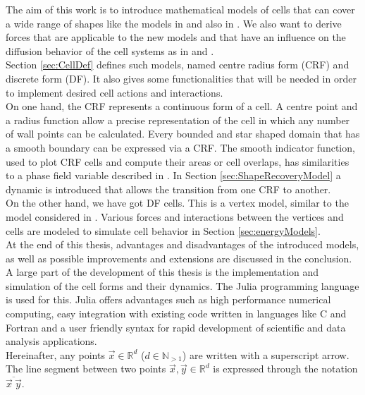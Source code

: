\documentclass[a4paper,12pt,leqno]{article}
\theoremstyle{plain}
\theoremstyle{remark}
\newcommand{\R}{\mathbb{R}}
\newcommand{\N}{\mathbb{N}}
\begin{document}
The aim of this work is to introduce mathematical models of cells that can cover a wide range of shapes like the models in \cite{Happel2023} and also in \cite{Fletcher14}. We also want to derive forces that are applicable to the new models and that have an influence on the diffusion behavior of the cell systems as in \cite{Bruna2012} and \cite{Bruna2017}. \\
Section \ref{sec:CellDef} defines such models, named centre radius form (CRF) and discrete form (DF). It also gives some functionalities that will be needed in order to implement desired cell actions and interactions. \\
On one hand, the CRF represents a continuous form of a cell. A centre point and a radius function allow a precise representation of the cell in which any number of wall points can be calculated. Every bounded and star shaped domain that has a smooth boundary can be expressed via a CRF. The smooth indicator function, used to plot CRF cells and compute their areas or cell overlaps, has similarities to a phase field variable described in \cite{Happel2023}. In Section \ref{sec:ShapeRecoveryModel} a dynamic is introduced that allows the transition from one CRF to another. \\
On the other hand, we have got DF cells. This is a vertex model, similar to the model considered in \cite{Fletcher14}. Various forces and interactions between the vertices and cells are modeled to simulate cell behavior in Section \ref{sec:energyModels}. \\
At the end of this thesis, advantages and disadvantages of the introduced models, as well as possible improvements and extensions are discussed in the conclusion. \\
A large part of the development of this thesis is the implementation and simulation of the cell forms and their dynamics. The Julia programming language is used for this. Julia offers advantages such as high performance numerical computing, easy integration with existing code written in languages like C and Fortran and a user friendly syntax for rapid development of scientific and data analysis applications. \\
Hereinafter, any points $\vec{x} \in \R^d$ ($d \in \N_{>1}$) are written with a superscript arrow. The line segment between two points $\vec{x}, \vec{y} \in \R^d$ is expressed through the notation $\overline{\vec{x} \: \vec{y}}$.



\newpage
\end{document}
